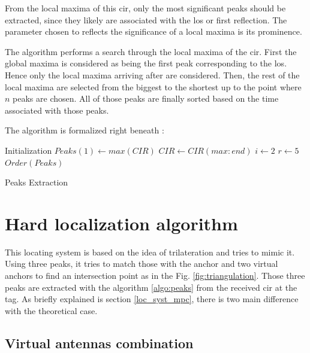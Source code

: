 From the local maxima  of this \gls{cir}, only the most significant peaks should be extracted, since they likely are associated with the \gls{los} or first reflection. The parameter chosen to reflects the significance of a local maxima is its prominence.
\vspace{2mm}

The algorithm performs a search through the local maxima of the \gls{cir}. First the global maxima is considered as being the first peak corresponding to the \gls{los}. Hence only the local maxima arriving after are considered. Then, the rest of the local maxima are selected from the biggest to the shortest up to the point where $n$ peaks are chosen. All of those peaks are finally sorted based on the time associated with those peaks. 

The algorithm is formalized right beneath :
\vspace{2mm}

\begin{algorithm}[H]
Initialization\;
$Peaks(1) \longleftarrow max(CIR)$\;
$CIR \longleftarrow CIR(max:end)$\;
$i \longleftarrow 2$\;
$r \longleftarrow 5$\;
 $Order(Peaks)$
 \caption{Peaks Extraction \label{algo:peaks}}
\end{algorithm}

\section{Hard localization algorithm}
\label{hard_loc}
This locating system is based on the idea of trilateration and tries to mimic it. Using three peaks, it tries to match those with the anchor and two virtual anchors to find an intersection point as in the Fig. \ref{fig:triangulation}. Those three peaks are extracted with the algorithm \ref{algo:peaks} from the received \gls{cir} at the tag. As briefly explained is section \ref{loc_syst_mpc}, there is two main difference with the theoretical case.

\subsection{Virtual antennas combination}

